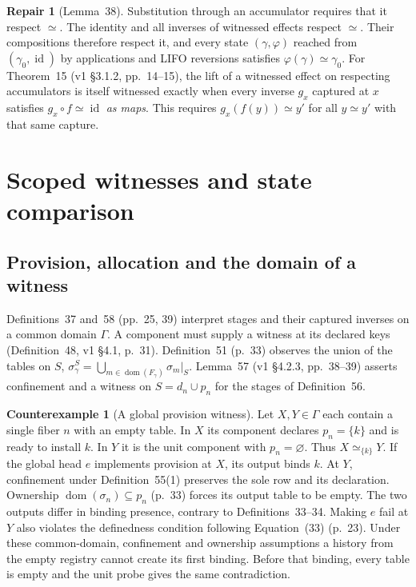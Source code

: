 \documentclass[11pt,a4paper]{article}
\theoremstyle{definition}
\newtheorem{counterexample}[definition]{Counterexample}
\newtheorem{repair}[definition]{Repair}
\theoremstyle{plain}
\newcommand{\dom}{\operatorname{dom}}
\newcommand{\id}{\operatorname{id}}
\begin{document}
\begin{repair}[Lemma~38]
Substitution through an accumulator requires that it respect $\simeq$.
The identity and all inverses of witnessed effects respect $\simeq$. Their compositions therefore respect it, and every state $(\gamma,\varphi)$ reached from $(\gamma_0,\id)$ by applications and LIFO reversions satisfies $\varphi(\gamma)\simeq\gamma_0$.
For Theorem~15 (v1 \S3.1.2, pp.~14--15), the lift of a witnessed effect on respecting accumulators is itself witnessed exactly when every inverse $g_x$ captured at $x$ satisfies $g_x\circ f\simeq\id$ \emph{as maps}. This requires $g_x(f(y))\simeq y'$ for all $y\simeq y'$ with that same capture.
\end{repair}

\section{Scoped witnesses and state comparison}
\label{sec:scoped}

\subsection{Provision, allocation and the domain of a witness}
\label{sec:scoped-sem}

Definitions~37 and~58 (pp.~25, 39) interpret stages and their captured inverses on a common domain $\Gamma$. A component must supply a witness at its declared keys (Definition~48, v1 \S4.1, p.~31).
Definition~51 (p.~33) observes the union of the tables on $S$,
$\sigma_\gamma^S=\bigcup_{m\in\dom(F_\gamma)}\sigma_m|_S$.
Lemma~57 (v1 \S4.2.3, pp.~38--39) asserts confinement and a witness on $S=d_n\cup p_n$ for the stages of Definition~56.

\begin{counterexample}[A global provision witness]
Let $X,Y\in\Gamma$ each contain a single fiber $n$ with an empty table. In $X$ its component declares $p_n=\{k\}$ and is ready to install $k$. In $Y$ it is the unit component with $p_n=\varnothing$. Thus $X\simeq_{\{k\}}Y$.
If the global head $e$ implements provision at $X$, its output binds $k$.
At $Y$, confinement under Definition~55(1) preserves the sole row and its declaration. Ownership $\dom(\sigma_n)\subseteq p_n$ (p.~33) forces its output table to be empty. The two outputs differ in binding presence, contrary to Definitions~33--34.
Making $e$ fail at $Y$ also violates the definedness condition following Equation~(33) (p.~23).
Under these common-domain, confinement and ownership assumptions a history from the empty registry cannot create its first binding. Before that binding, every table is empty and the unit probe gives the same contradiction.
\end{counterexample}
\end{document}
